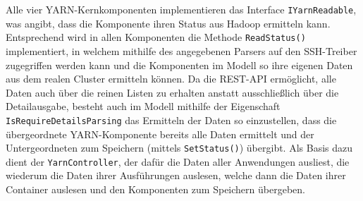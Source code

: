 Alle vier YARN-Kernkomponenten implementieren das Interface \texttt{IYarnReadable}, was angibt, dass die Komponente ihren Status aus Hadoop ermitteln kann. Entsprechend wird in allen Komponenten die Methode \texttt{ReadStatus()} implementiert, in welchem mithilfe des angegebenen Parsers auf den SSH-Treiber zugegriffen werden kann und die Komponenten im Modell so ihre eigenen Daten aus dem realen Cluster ermitteln können. Da die REST-API ermöglicht, alle Daten auch über die reinen Listen zu erhalten anstatt ausschließlich über die Detailausgabe, besteht auch im Modell mithilfe der Eigenschaft \texttt{IsRequireDetailsParsing} das Ermitteln der Daten so einzustellen, dass die übergeordnete YARN-Komponente bereits alle Daten ermittelt und der Untergeordneten zum Speichern (mittels \texttt{SetStatus()}) übergibt. Als Basis dazu dient der \texttt{YarnController}, der dafür die Daten aller Anwendungen ausliest, die wiederum die Daten ihrer Ausführungen auslesen, welche dann die Daten ihrer Container auslesen und den Komponenten zum Speichern übergeben.